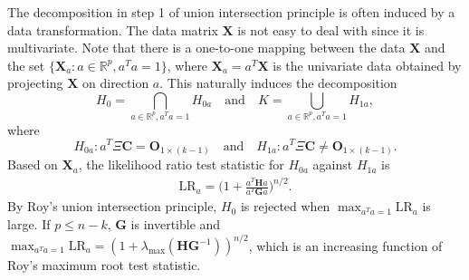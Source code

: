 \documentclass[12pt]{article} %
\newcommand{\bX}{\mathbf{X}}
\newcommand{\bH}{\mathbf{H}}
\newcommand{\bG}{\mathbf{G}}
\newcommand{\bC}{\mathbf{C}}
\newcommand{\bO}{\mathbf{O}}
\newcommand{\bfsym}[1]{\ensuremath{\boldsymbol{#1}}}
\def\bSigma {\bfsym {\Sigma}}
\theoremstyle{definition}
\begin{document}
The decomposition in step 1 of union intersection principle is often induced by a data transformation.
The data matrix $\bX$ is not easy to deal with since it is multivariate. 
 Note that there is a one-to-one mapping between the data $\bX$ and the set $\{\bX_a: a\in\mathbb{R}^p, a^T a=1\}$, where $\bX_a=a^T \bX$ is the univariate data obtained by projecting $\bX$ on direction $a$.
 This naturally induces the decomposition  
 $$H_0=\bigcap_{a\in \mathbb{R}^p, a^T a=1}H_{0a} \quad\text{and}\quad K=\bigcup_{a\in \mathbb{R}^p,a^T a=1}H_{1a} ,$$
 where
 $$
 H_{0a}: a^T \Xi \bC = \bO_{1\times (k-1)}\quad \text{and}\quad H_{1a} : a^T \Xi \bC \neq \bO_{1\times (k-1)}.
 $$
Based on $\bX_a$, the likelihood ratio test statistic for $H_{0a}$ against $H_{1a}$ is
\begin{equation*}
    \begin{aligned}
        \text{LR}_{a}%
        =
        \Big(1+\frac{a^T \bH a}{a^T \bG a}\Big)^{n/2}.
    \end{aligned}
\end{equation*}
By Roy's union intersection principle, $H_0$ is rejected when $\max_{a^T a=1}\text{LR}_a$ is large.
If $p\leq n-k$, $\bG$ is invertible and
$\max_{a^T a=1}\text{LR}_a=(1+\lambda_{\max}(\bH\bG^{-1}))^{n/2}$, which is an increasing function of Roy's maximum root test statistic.
\end{document}
